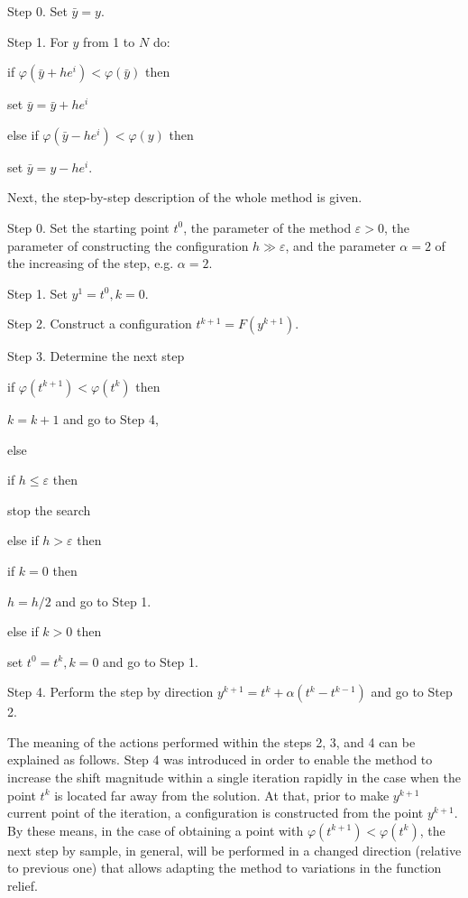 \documentclass[runningheads]{llncs}
\begin{document}
Step 0. Set $\bar{y} = y$.

Step 1. For $y$ from 1 to $N$ do:

\>\>\>\> if $\varphi(\bar{y} + he^i) < \varphi(\bar{y})$ then 

\>\>\>\>\>\>\>\> set $\bar{y} = \bar{y} + he^i$ 

\>\>\>\> else if $\varphi(\bar{y} - he^i) < \varphi(y)$ then 

\>\>\>\>\>\>\>\> set $\bar{y} = y - he^i.$

Next, the step-by-step description of the whole method is given.

Step 0. Set the starting point $t^0$, the parameter of the method $\varepsilon > 0$, the parameter of constructing the configuration $h\gg\varepsilon$, and the parameter $\alpha = 2$ of the increasing of the step, e.g. $\alpha = 2$.

Step 1. Set $y^1  = t^0, k = 0$.

Step 2. Construct a configuration $t^{k+1} = F(y^{k +1})$.

Step 3. Determine the next step

\>\>\>\> if $\varphi(t^{k + 1}) < \varphi(t^{k})$ then 

\>\>\>\>\>\>\>\> $k = k + 1$ and go to Step 4, 

\>\>\>\> else 

\>\>\>\>\>\>\>\> if $h \leq \varepsilon$ then 

\>\>\>\>\>\>\>\>\>\>\>\>  stop the search 

\>\>\>\>\>\>\>\> else if $h > \varepsilon$ then 

\>\>\>\>\>\>\>\>\>\>\>\> if $k = 0$ then 

\>\>\>\>\>\>\>\>\>\>\>\>\>\>\>\> $h = h / 2$ and go to Step 1. 

\>\>\>\>\>\>\>\>\>\>\>\> else if $k > 0$ then 

\>\>\>\>\>\>\>\>\>\>\>\>\>\>\>\> set $t^0 = t^k, k = 0$ and go to Step 1.

Step 4. Perform the step by direction $y^{k + 1} = t^k + \alpha (t^k - t^{k - 1})$ and go to Step 2.

The meaning of the actions performed within the steps 2, 3, and 4 can be explained as follows. 
Step 4 was introduced in order to enable the method to increase the shift magnitude within a single iteration rapidly in the case when the point $t^k$ is located far away from the solution. At that, prior to make $y^{k+1}$ current point of the iteration, a configuration is constructed from the point $y^{k+1}$. By these means, in the case of obtaining a point with $\varphi(t^{k+1})< \varphi(t^k)$, the next step by sample, in general, will be performed in a changed direction (relative to previous one) that allows adapting the method to variations in the function relief.
\end{document}

